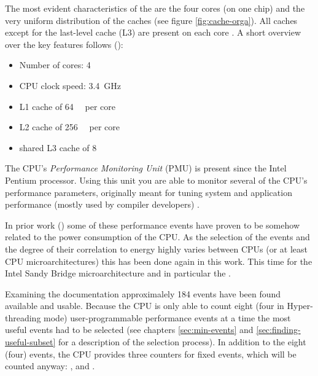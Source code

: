 The most evident characteristics of the \JWPcpu{} are the four cores (on one
chip) and the very uniform distribution of the caches (see figure
\ref{fig:cache-orga}). All caches except for the last-level cache (L3) are
present on each core \cite{fog11}. A short overview over the key features
follows (\cite{intel2011spec}):

\begin{itemize}

\item Number of cores: 4

\item CPU clock speed: \SI{3.4}{\giga\hertz}

\item L1 cache of \SI{64}{\kibi\byte} per core\cite{intel2011softdev1}

\item L2 cache of \SI{256}{\kibi\byte} per core\cite{intel2011softdev1}

\item shared L3 cache of \SI{8}{\mebi\byte}\cite{intel2011softdev1}

\end{itemize}


\label{sec:pmu}

The CPU's \emph{Performance Monitoring Unit} (PMU) is present since the
Intel\TReg{} Pentium processor. Using this unit you are able to monitor several
of the CPU's performance parameters, originally meant for tuning system and
application performance (mostly used by compiler developers)
\cite{intel2011softdev3b}.

In prior work (\cite{bellosa2000benefits,snowdon2010operating,
weissel2002process,kellner03tempcontrol,bertran2010decomposable}) some of these
performance events have proven to be somehow related to the power consumption of
the CPU. As the selection of the events and the degree of their correlation to
energy highly varies between CPUs (or at least CPU microarchitectures) this has
been done again in this work. This time for the Intel\TReg{} Sandy Bridge
microarchitecture and in particular the \JWPcpu{}.

Examining the documentation \cite{intel2011events} approximalely 184 events have
been found available and usable. Because the CPU is only able to count eight
(four in Hyper-threading \cite{wiki:HT} mode) user-programmable performance
events at a time \cite{intel2011softdev1} the most useful events had to be
selected (see chapters \ref{sec:min-events} and \ref{sec:finding-useful-subset}
for a description of  the selection process). In addition to the eight (four)
events, the CPU provides three counters for fixed events, which will be counted
anyway: , 
and .


